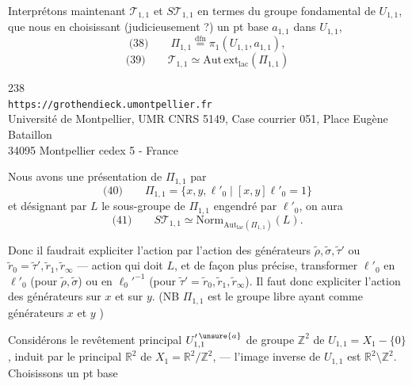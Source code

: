 Interprétons maintenant $\mathcal T_{1,1}$ et $S\mathcal T_{1,1}$ en termes du groupe fondamental de $U_{1,1}$, que nous  en choisissant (judicieusement ?) un pt base $a_{1,1}$ dans $U_{1,1}$,
\[
\text{(38)}\qquad
\Pi_{1,1}\overset{\mathrm{dfn}}=\pi_1(U_{1,1},a_{1,1}),
\]
\[
\text{(39)}\qquad
\mathcal T_{1,1}\simeq\mathrm{Aut\,ext}_{\mathrm{lac}}(\Pi_{1,1})
\]

\begin{center}
238\\
\texttt{https://grothendieck.umontpellier.fr}\\
Université de Montpellier, UMR CNRS 5149, Case courrier 051, Place Eugène Bataillon\\
34095 Montpellier cedex 5 - France
\end{center}



Nous avons une présentation de $\Pi_{1,1}$ par
\[
\text{(40)}\qquad
\Pi_{1,1}=\{x,y,\ell'_0\mid [x,y]\ell'_0=1\}
\]
et désignant par $L$ le sous-groupe de $\Pi_{1,1}$ engendré par $\ell'_0$, on aura
\[
\text{(41)}\qquad
S\mathcal T_{1,1}\simeq
\mathrm{Norm}_{\mathrm{Aut}_{\mathrm{lac}}(\Pi_{1,1})}(L).
\]

Donc il faudrait expliciter l'action
par l'action des générateurs $\widetilde\rho,\widetilde\sigma,\widetilde\tau'$ ou $\widetilde r_0=\widetilde\tau',\widetilde r_1,\widetilde r_\infty$ --- action qui doit  $L$, et de façon plus précise, transformer $\ell'_0$ en $\ell'_0$ (pour $\widetilde\rho,\widetilde\sigma$) ou en $\ell_0'^{-1}$ (pour $\widetilde\tau'=\widetilde r_0,\widetilde r_1,\widetilde r_\infty$). Il faut donc expliciter l'action des générateurs sur $x$ et sur $y$. (NB $\Pi_{1,1}$ est le groupe libre ayant comme générateurs $x$ et $y$ \unsure{!})

Considérons le revêtement principal $U_{1,1}^{\prime\,\unsure{a}}$ de groupe $\mathbb Z^2$ de $U_{1,1}=X_1-\{0\}$, induit par le  principal $\mathbb R^2$ de $X_1=\mathbb R^2/\mathbb Z^2$, --- l'image inverse de $U_{1,1}$ est $\mathbb R^2\setminus\mathbb Z^2$. Choisissons un pt base 

